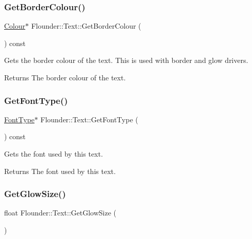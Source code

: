 \subsubsection{\texorpdfstring{Get\+Border\+Colour()}{GetBorderColour()}}
{\footnotesize\ttfamily \hyperlink{class_flounder_1_1_colour}{Colour}$\ast$ Flounder\+::\+Text\+::\+Get\+Border\+Colour (\begin{DoxyParamCaption}{ }\end{DoxyParamCaption}) const\hspace{0.3cm}{\ttfamily [inline]}}



Gets the border colour of the text. This is used with border and glow drivers. 

\begin{DoxyReturn}{Returns}
The border colour of the text. 
\end{DoxyReturn}
\mbox{\label{class_flounder_1_1_text_ac12acd427fde7758f6bfd68c050d663d}} 
\subsubsection{\texorpdfstring{Get\+Font\+Type()}{GetFontType()}}
{\footnotesize\ttfamily \hyperlink{class_flounder_1_1_font_type}{Font\+Type}$\ast$ Flounder\+::\+Text\+::\+Get\+Font\+Type (\begin{DoxyParamCaption}{ }\end{DoxyParamCaption}) const\hspace{0.3cm}{\ttfamily [inline]}}



Gets the font used by this text. 

\begin{DoxyReturn}{Returns}
The font used by this text. 
\end{DoxyReturn}
\mbox{\label{class_flounder_1_1_text_af1c0f4c529861a46a0738ad01c4e5d09}} 
\subsubsection{\texorpdfstring{Get\+Glow\+Size()}{GetGlowSize()}}
{\footnotesize\ttfamily float Flounder\+::\+Text\+::\+Get\+Glow\+Size (\begin{DoxyParamCaption}{ }\end{DoxyParamCaption})}



